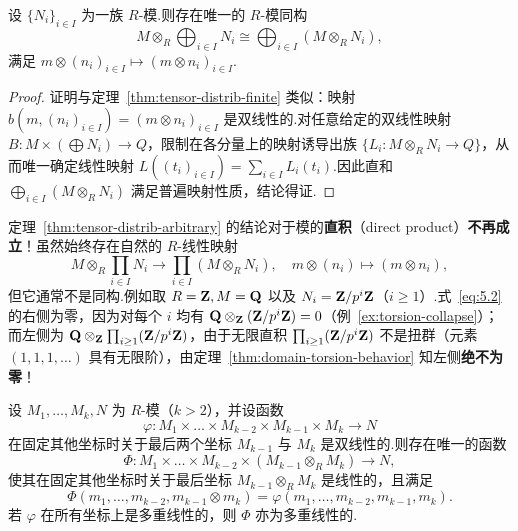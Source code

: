 \begin{theorem}[对任意直和的分配律]\label{thm:tensor-distrib-arbitrary}
设 $\{N_i\}_{i \in I}$ 为一族 $R$-模.则存在唯一的 $R$-模同构
\[
  M \otimes_R \bigoplus_{i \in I} N_i \cong \bigoplus_{i \in I} (M \otimes_R N_i),
\]
满足 $m \otimes (n_i)_{i \in I} \mapsto (m \otimes n_i)_{i \in I}$.
\end{theorem}

\begin{proof}
证明与定理~\ref{thm:tensor-distrib-finite} 类似：映射 $b(m, (n_i)_{i \in I}) = (m \otimes n_i)_{i \in I}$ 是双线性的.对任意给定的双线性映射 $B \colon M \times (\bigoplus N_i) \to Q$，限制在各分量上的映射诱导出族 $\{L_i \colon M \otimes_R N_i \to Q\}$，从而唯一确定线性映射 $L((t_i)_{i \in I}) = \sum_{i \in I} L_i(t_i)$.因此直和 $\bigoplus_{i \in I} (M \otimes_R N_i)$ 满足普遍映射性质，结论得证.
\end{proof}

\begin{remark}\label{rem:tensor-prod-counterexample}
定理~\ref{thm:tensor-distrib-arbitrary} 的结论对于模的\textbf{直积}（direct product）\textbf{不再成立}！虽然始终存在自然的 $R$-线性映射
\begin{equation}
  M \otimes_R \prod_{i \in I} N_i \to \prod_{i \in I} (M \otimes_R N_i), \quad m \otimes (n_i) \mapsto (m \otimes n_i), \label{eq:5.2}
\end{equation}
但它通常不是同构.例如取 $R = \mathbf{Z}, M = \mathbf{Q}$ 以及 $N_i = \mathbf{Z}/p^i\mathbf{Z}$（$i \geq 1$）.式~\eqref{eq:5.2} 的右侧为零，因为对每个 $i$ 均有 $\mathbf{Q} \otimes_{\mathbf{Z}} (\mathbf{Z}/p^i\mathbf{Z}) = 0$（例~\ref{ex:torsion-collapse}）；而左侧为 $\mathbf{Q} \otimes_{\mathbf{Z}} \prod_{i \geq 1} (\mathbf{Z}/p^i\mathbf{Z})$，由于无限直积 $\prod_{i \geq 1} (\mathbf{Z}/p^i\mathbf{Z})$ 不是扭群（元素 $(1, 1, 1, \dots)$ 具有无限阶），由定理~\ref{thm:domain-torsion-behavior} 知左侧\textbf{绝不为零}！
\end{remark}

\begin{theorem}[部分变量张量化的技术引理]\label{thm:partial-tensor-lemma}
设 $M_1, \dots, M_k, N$ 为 $R$-模（$k > 2$），并设函数
\[
  \varphi \colon M_1 \times \dots \times M_{k-2} \times M_{k-1} \times M_k \to N
\]
在固定其他坐标时关于最后两个坐标 $M_{k-1}$ 与 $M_k$ 是双线性的.则存在唯一的函数
\[
  \Phi \colon M_1 \times \dots \times M_{k-2} \times (M_{k-1} \otimes_R M_k) \to N,
\]
使其在固定其他坐标时关于最后坐标 $M_{k-1} \otimes_R M_k$ 是线性的，且满足
\begin{equation}
  \Phi(m_1, \dots, m_{k-2}, m_{k-1} \otimes m_k) = \varphi(m_1, \dots, m_{k-2}, m_{k-1}, m_k). \label{eq:5.3}
\end{equation}
若 $\varphi$ 在所有坐标上是多重线性的，则 $\Phi$ 亦为多重线性的.
\end{theorem}

